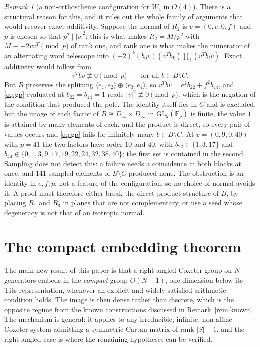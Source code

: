 \documentclass[11pt]{article}
\theoremstyle{definition}
\theoremstyle{remark}
\newtheorem{remark}[theorem]{Remark}
\theoremstyle{definition}
\begin{document}
\begin{remark}[a non-orthoscheme configuration for $W_4$ in $O(4)$]
There is a structural reason for this, and it rules out the whole family of arguments that would
recover exact additivity. Suppose the normal of $R_2$ is $v=(0,e,0,f)$ and $p$ is chosen so that
$p^2\mid\lvert v\rvert^2$; this is what makes $R_2=M/p^2$ with $M\equiv-2vv^{T}\pmod p$ of rank
one, and rank one is what makes the numerator of an alternating word telescope into
$(-2)^k(b_0v)(v^{T}b_k)\prod_i(v^{T}b_iv)$. Exact additivity would follow from
\begin{equation}\label{eq:gp}
  v^{T}bv\not\equiv0\pmod p\qquad\text{for all }b\in B\setminus C.
\end{equation}
But $B$ preserves the splitting $\langle e_1,e_2\rangle\oplus\langle e_3,e_4\rangle$, so
$v^{T}bv=e^2b_{22}+f^2b_{44}$, and \eqref{eq:gp} evaluated at $b_{22}=b_{44}=1$ reads
$\lvert v\rvert^2\not\equiv0\pmod p$, which is the negation of the condition that produced the
pole. The identity itself lies in $C$ and is excluded, but the image of each factor of
$B\cong D_\infty\times D_\infty$ in $\mathrm{GL}_2(\mathbb{F}_p)$ is finite, the value $1$ is
attained by many elements of each, and the product is direct, so every pair of values occurs and
\eqref{eq:gp} fails for infinitely many $b\in B\setminus C$. At $v=(0,9,0,40)$ with $p=41$ the
two factors have order $10$ and $40$, with $b_{22}\in\{1,3,17\}$ and
$b_{44}\in\{0,1,3,9,17,19,22,24,32,38,40\}$; the first set is contained in the second. Sampling
does not detect this: a failure needs a coincidence in both blocks at once, and $141$ sampled
elements of $B\setminus C$ produced none. The obstruction is an identity in $e,f,p$, not a
feature of the configuration, so no choice of normal avoids it. A proof must therefore either
break the direct product structure of $B$, by placing $R_1$ and $R_3$ in planes that are not
complementary, or use a seed whose degeneracy is not that of an isotropic normal.
\end{remark}

\section{The compact embedding theorem}\label{sec:embed}

The main new result of this paper is that a right-angled Coxeter group on $N$ generators embeds in
the \emph{compact} group $O(N-1)$, one dimension below its Tits representation, whenever an
explicit and widely satisfied arithmetic condition holds. The image is then dense rather than
discrete, which is the opposite regime from the known constructions discussed in
Remark~\ref{rem:known}. The mechanism is general: it applies to any irreducible, infinite,
non-affine Coxeter system admitting a symmetric Cartan matrix of rank $|S|-1$, and the right-angled
case is where the remaining hypotheses can be verified.
\end{document}

